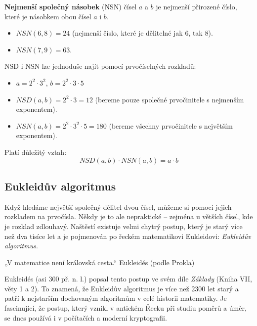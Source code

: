 \documentclass[12pt,a4paper]{article}
\begin{document}
\begin{definitionbox}
\textbf{Nejmenší společný násobek} (NSN) čísel $a$ a $b$ je nejmenší přirozené číslo, které je násobkem obou čísel $a$ i $b$.  
\end{definitionbox}

\begin{examplebox}
\begin{itemize}
    \item $NSN(6, 8) = 24$ (nejmenší číslo, které je dělitelné jak $6$, tak $8$).  
    \item $NSN(7, 9) = 63$.
\end{itemize}
\end{examplebox}

\begin{notebox}
NSD i NSN lze jednoduše najít pomocí prvočíselných rozkladů:  
\begin{itemize}
    \item $a = 2^2 \cdot 3^2$, \quad $b = 2^2 \cdot 3 \cdot 5$  
    \item $NSD(a,b) = 2^2 \cdot 3 = 12$ (bereme pouze společné prvočinitele s nejmenším exponentem).  
    \item $NSN(a,b) = 2^2 \cdot 3^2 \cdot 5 = 180$ (bereme všechny prvočinitele s největším exponentem).  
\end{itemize}
\end{notebox}

\begin{notebox}
Platí důležitý vztah:  
\[
NSD(a,b) \cdot NSN(a,b) = a \cdot b
\]
\end{notebox}


\subsection{Eukleidův algoritmus}

Když hledáme největší společný dělitel dvou čísel, můžeme si pomoci jejich rozkladem na prvočísla.  
Někdy je to ale nepraktické – zejména u větších čísel, kde je rozklad zdlouhavý.  
Naštěstí existuje velmi chytrý postup, který je starý více než dva tisíce let a je pojmenován po řeckém matematikovi Eukleidovi: \emph{Eukleidův algoritmus}.  

\begin{quotebox}
{„V matematice není královská cesta.“}
{Eukleidés (podle Prokla)}
\end{quotebox}


\begin{historicalbox}
Eukleidés (asi 300 př. n. l.) popsal tento postup ve svém díle \emph{Základy} (Kniha VII, věty 1 a 2).  
To znamená, že Eukleidův algoritmus je více než 2300 let starý a patří k nejstarším dochovaným algoritmům v celé historii matematiky.  
Je fascinující, že postup, který vznikl v antickém Řecku při studiu poměrů a úměr, se dnes používá i v počítačích a moderní kryptografii.  
\end{historicalbox}
\end{document}
